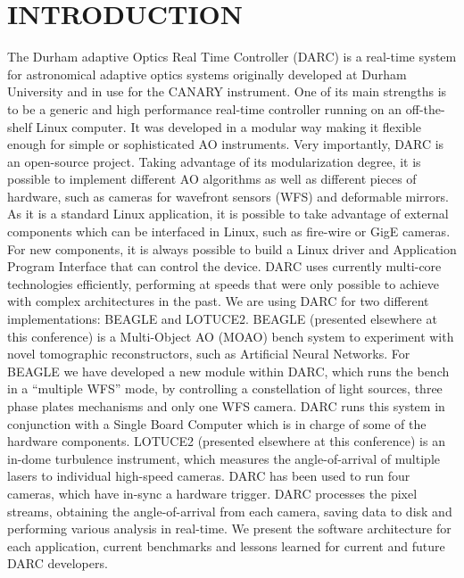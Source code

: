 \documentclass[]{spie}  %
\begin{document}
\section{INTRODUCTION}\label{sec:intro}  %
The Durham adaptive Optics Real Time Controller (DARC) is a real-time system
for astronomical adaptive optics systems originally developed at Durham
University and in use for the CANARY instrument. One of its main strengths is
to be a generic and high performance real-time controller running on an
off-the-shelf Linux computer. It was developed in a modular way making it
flexible enough for simple or sophisticated AO instruments. Very importantly,
DARC is an open-source project. Taking advantage of its modularization degree,
it is possible to implement different AO algorithms as well as different pieces
of hardware, such as cameras for wavefront sensors (WFS) and deformable
mirrors. As it is a standard Linux application, it is possible to take
advantage of external components which can be interfaced in Linux, such as
fire-wire or GigE cameras. For new components, it is always possible to build a
Linux driver and Application Program Interface that can control the device.
DARC uses currently multi-core technologies efficiently, performing at speeds
that were only possible to achieve with complex architectures in the past\cite{basden2012durham}. 
We are using DARC for two different implementations: BEAGLE and LOTUCE2. BEAGLE
(presented elsewhere at this conference) is a Multi-Object AO (MOAO) bench
system to experiment with novel tomographic reconstructors, such as Artificial
Neural Networks. For BEAGLE we have developed a new module within DARC, which
runs the bench in a ``multiple WFS'' mode, by controlling a constellation of light
sources, three phase plates mechanisms and only one WFS camera. DARC runs this
system in conjunction with a Single Board Computer which is in charge of some
of the hardware components. LOTUCE2 (presented elsewhere at this conference) is
an in-dome turbulence instrument, which measures the angle-of-arrival of
multiple lasers to individual high-speed cameras. DARC has been used to run
four cameras, which have in-sync a hardware trigger. DARC processes the pixel
streams, obtaining the angle-of-arrival from each camera, saving data to disk
and performing various analysis in real-time. We present the software
architecture for each application, current benchmarks and lessons learned for
current and future DARC developers.
\end{document}
